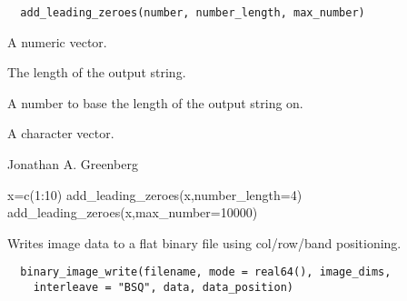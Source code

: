 \documentclass[a4paper]{book}
\begin{document}
%
\begin{Usage}
\begin{verbatim}
  add_leading_zeroes(number, number_length, max_number)
\end{verbatim}
\end{Usage}
%
\begin{Arguments}
\begin{ldescription}
\item[\code{number}] A numeric vector.

\item[\code{number\_length}] The length of the output string.

\item[\code{max\_number}] A number to base the length of the
output string on.
\end{ldescription}
\end{Arguments}
%
\begin{Value}
A character vector.
\end{Value}
%
\begin{Author}\relax
Jonathan A. Greenberg
\end{Author}
%
\begin{Examples}
\begin{ExampleCode}
x=c(1:10)
add_leading_zeroes(x,number_length=4)
add_leading_zeroes(x,max_number=10000)
\end{ExampleCode}
\end{Examples}
%
\begin{Description}\relax
Writes image data to a flat binary file using
col/row/band positioning.
\end{Description}
%
\begin{Usage}
\begin{verbatim}
  binary_image_write(filename, mode = real64(), image_dims,
    interleave = "BSQ", data, data_position)
\end{verbatim}
\end{Usage}
%
\end{document}
